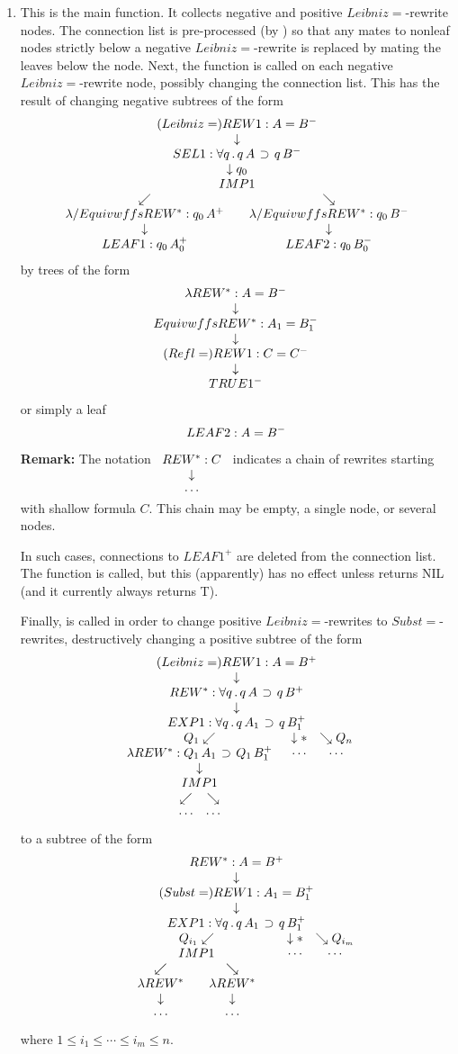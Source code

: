 \begin{enumerate}
\item {\bf{}}  This is the main function.
It collects negative and positive $Leibniz=$-rewrite nodes.
The connection list is pre-processed (by )
so that any mates to nonleaf nodes
strictly below a negative $Leibniz=$-rewrite is replaced by mating the leaves
below the node.  Next, the function  is called
on each negative $Leibniz=$-rewrite node, possibly changing the connection list.
This has the result of changing negative subtrees of the form
$$\erew{1}{Leibniz=}{A = B^-}{\sel{1}{\forall q \, .\, q\, A\, \limplies\, q\, B^-}
{q_0}{\eimp{1}{q_0\, A\, \limplies \, q_0\, B^-}
{\erewstar{\lambda/Equivwffs}{q_0\, A^+}{\eleaf{1}{q_0\, A_0^+}}}
{\erewstar{\lambda/Equivwffs}{q_0\, B^-}{\eleaf{2}{q_0\, B_0^-}}}}}$$
by trees of the form
$$\erewstar{\lambda}{A = B^-}{\erewstar{Equivwffs}{A_1 = B_1^-}{\erew{1}{Refl=}{C = C^-}{\truenode{1^-}}}}$$
or simply a leaf
$$\eleaf{2}{A = B^-}$$

{\bf Remark:}  The notation $\erewstar{}{C}{\cdots}$ indicates a chain of
rewrites starting with shallow formula $C$.  This chain may be empty,
a single node, or several nodes.

In such cases, connections to $LEAF1^+$ are deleted from the connection list.
The function  is called, but this
(apparently) has no effect unless 
returns NIL (and it currently always returns T).

Finally,  is called in order to
change positive $Leibniz=$-rewrites to $Subst=$-rewrites, destructively changing
a positive subtree of the form
$$\erew{1}{Leibniz=}{A = B^+}{\erewstar{}{\forall q\, . \, q\, A \, \limplies\, q\, B^+}
{\gexpnode{1}{\forall q\, . \, q\, A_1 \, \limplies\, q\, B_1^+}
{Q_1}{\erewstar{\lambda}{Q_1\, A_1 \, \limplies\, Q_1\, B_1^+}
{\eimp{1}{C_1\, \limplies \, D_1^+}{\cdots}{\cdots}}}
{Q_n}{\cdots}}}$$
to a subtree of the form
$$\erewstar{}{A = B^+}{\erew{1}{Subst=}{A_1 = B_1^+}
{\gexpnode{1}{\forall q\, . \, q\, A_1 \, \limplies\, q\, B_1^+}
{Q_{i_1}}{\eimp{1}{Q_{i_1}\, A_1 \, \limplies\, Q_{i_1}\, B_1^+}{\erewstarnf{\lambda}{\cdots}}{\erewstarnf{\lambda}{\cdots}}}
{Q_{i_m}}{\cdots}}}$$
where $1 \leq i_1 \leq \cdots \leq i_m \leq n$.


\end{enumerate}
